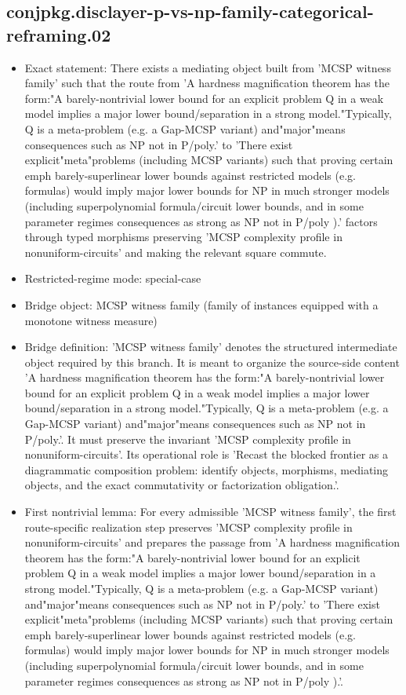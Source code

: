 \documentclass[11pt]{article}
\begin{document}
\subsection*{conjpkg.disclayer-p-vs-np-family-categorical-reframing.02}
\begin{itemize}
\item Exact statement: There exists a mediating object built from 'MCSP witness family' such that the route from 'A hardness magnification theorem has the form:"A barely-nontrivial lower bound for an explicit problem Q in a weak model implies a major lower bound/separation in a strong model."Typically, Q is a meta-problem (e.g. a Gap-MCSP variant) and"major"means consequences such as NP not in P/poly.' to 'There exist explicit"meta"problems (including MCSP variants) such that proving certain emph barely-superlinear lower bounds against restricted models (e.g. formulas) would imply major lower bounds for NP in much stronger models (including superpolynomial formula/circuit lower bounds, and in some parameter regimes consequences as strong as NP not in P/poly ).' factors through typed morphisms preserving 'MCSP complexity profile in nonuniform-circuits' and making the relevant square commute.
\item Restricted-regime mode: special-case
\item Bridge object: MCSP witness family (family of instances equipped with a monotone witness measure)
\item Bridge definition: 'MCSP witness family' denotes the structured intermediate object required by this branch. It is meant to organize the source-side content 'A hardness magnification theorem has the form:"A barely-nontrivial lower bound for an explicit problem Q in a weak model implies a major lower bound/separation in a strong model."Typically, Q is a meta-problem (e.g. a Gap-MCSP variant) and"major"means consequences such as NP not in P/poly.'. It must preserve the invariant 'MCSP complexity profile in nonuniform-circuits'. Its operational role is 'Recast the blocked frontier as a diagrammatic composition problem: identify objects, morphisms, mediating objects, and the exact commutativity or factorization obligation.'.
\item First nontrivial lemma: For every admissible 'MCSP witness family', the first route-specific realization step preserves 'MCSP complexity profile in nonuniform-circuits' and prepares the passage from 'A hardness magnification theorem has the form:"A barely-nontrivial lower bound for an explicit problem Q in a weak model implies a major lower bound/separation in a strong model."Typically, Q is a meta-problem (e.g. a Gap-MCSP variant) and"major"means consequences such as NP not in P/poly.' to 'There exist explicit"meta"problems (including MCSP variants) such that proving certain emph barely-superlinear lower bounds against restricted models (e.g. formulas) would imply major lower bounds for NP in much stronger models (including superpolynomial formula/circuit lower bounds, and in some parameter regimes consequences as strong as NP not in P/poly ).'.

\end{itemize}
\end{document}
